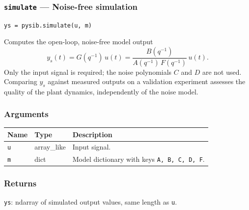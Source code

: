 \documentclass[../main]{subfiles}
\begin{document}
\newpage

\subsubsection{\texttt{simulate} --- Noise-free simulation}

\begin{lstlisting}
ys = pysib.simulate(u, m)
\end{lstlisting}

Computes the open-loop, noise-free model output
\[
  y_s(t) = G(q^{-1})\,u(t) = \frac{B(q^{-1})}{A(q^{-1})\,F(q^{-1})}\,u(t).
\]
Only the input signal is required; the noise polynomials $C$ and $D$
are not used.  Comparing $y_s$ against measured outputs on a
validation experiment assesses the quality of the plant dynamics,
independently of the noise model.

\subsubsection*{Arguments}
\begin{center}
\begin{tabular}{lll}
  \toprule
  Name & Type & Description \\
  \midrule
  \texttt{u} & array\_like & Input signal. \\
  \texttt{m} & dict & Model dictionary with keys \texttt{A, B, C, D, F}. \\
  \bottomrule
\end{tabular}
\end{center}

\subsubsection*{Returns}
\texttt{ys}: ndarray of simulated output values, same length as \texttt{u}.
\end{document}
